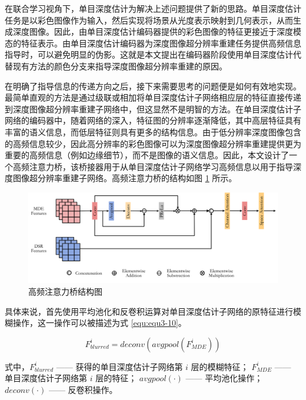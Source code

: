 在联合学习视角下，单目深度估计为解决上述问题提供了新的思路。单目深度估计任务是以彩色图像作为输入，然后实现将场景从光度表示映射到几何表示，从而生成深度图像。因此，由单目深度估计编码器提供的彩色图像的特征更接近于深度模态的特征表示。由单目深度估计编码器为深度图像超分辨率重建任务提供高频信息指导时，可以避免明显的伪影。这就是本文提出在编码器阶段使用单目深度估计代替现有方法的颜色分支来指导深度图像超分辨率重建的原因。

在明确了指导信息的传递方向之后，接下来需要思考的问题便是如何有效地实现。最简单直观的方法是通过级联或相加将单目深度估计子网络相应层的特征直接传递到深度图像超分辨率重建子网络中，但这显然不是明智的方法。在单目深度估计子网络的编码器中，随着网络的深入，特征图的分辨率逐渐降低，其中高层特征具有丰富的语义信息，而低层特征则具有更多的结构信息。由于低分辨率深度图像包含的高频信息较少，因此高分辨率的彩色图像可以为深度图像超分辨率重建提供更为重要的高频信息（例如边缘细节），而不是图像的语义信息。因此，本文设计了一个高频注意力桥，该桥接器用于从单目深度估计子网络学习高频信息以用于指导深度图像超分辨率重建子网络。高频注意力桥的结构如图 \ref{fig:fig3-5} 所示。

\begin{figure}[!htbp]
	\centering
	\includegraphics{figures/22.png}
	\caption{高频注意力桥结构图}
	\label{fig:fig3-5}
\end{figure}

具体来说，首先使用平均池化和反卷积运算对单目深度估计子网络的原特征进行模糊操作，这一操作可以被描述为式 \ref{equ:equ3-10}。

\begin{equation}
	F_{blurred}^i=deconv\left(avgpool\left(F_{MDE}^i\right)\right)
	\label{equ:equ3-10}
\end{equation}

\noindent 式中，$F_{blurred}^i$ —— 获得的单目深度估计子网络第 $i$ 层的模糊特征；\newline
\indent\quad  $F_{MDE}^i$ —— 单目深度估计子网络第 $i$ 层的特征；\newline
\indent\quad $avgpool\left(\cdot\right)$ —— 平均池化操作；\newline
\indent\quad $deconv\left(\cdot\right)$ —— 反卷积操作。

